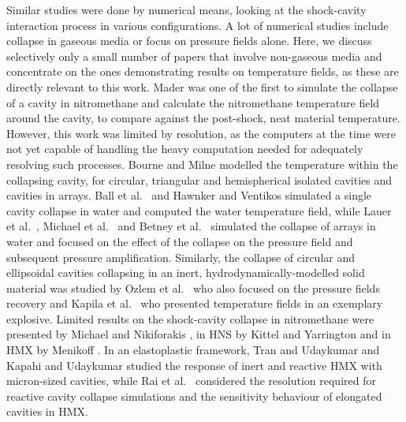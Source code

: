 \documentclass[3p,times,twocolumn]{elsarticle}
\begin{document}
Similar studies were done by numerical means, looking at the shock-cavity interaction process in various configurations. A lot of numerical studies include collapse in gaseous media or focus on pressure fields alone. Here, we discuss selectively only a small number of papers that involve non-gaseous media and concentrate on the ones demonstrating results on temperature fields, as these are directly relevant to this work. Mader \cite{mader1979numerical} was one of the first to simulate the collapse of a cavity in nitromethane and calculate the nitromethane temperature field around the cavity, to compare against the post-shock, neat material temperature. However, this work was limited by resolution, as the computers at the time were not yet capable of handling the heavy computation needed for adequately resolving such processes. Bourne and Milne \cite{bourne2002cavity,bourne2003temperature} modelled the temperature within the collapsing cavity, for circular, triangular and hemispherical isolated cavities and cavities in arrays. 
Ball et al.\ \cite{ball2000shock} and Hawnker and Ventikos \cite{hawker2012interaction} simulated a single cavity collapse in water and computed the water temperature field, while Lauer et al.\ \cite{lauer2012numerical}, Michael et al.\ \cite{michael2010numerical} and Betney et al.\ \cite{betney2015computational}  simulated the collapse of arrays in water and focused on the effect of the collapse on the pressure field and subsequent pressure amplification. 
Similarly, the collapse of circular and ellipsoidal cavities collapsing in an inert, hydrodynamically-modelled solid material was studied by Ozlem et al.\ \cite{ozlem2012numerical} who also focused on the pressure fields recovery and Kapila et al.\ \cite{kapila2015numerical} who presented temperature fields in an exemplary explosive. Limited results on the shock-cavity collapse in nitromethane were presented by Michael and Nikiforakis \cite{michael2015DetSymp}, in HNS by  Kittel and Yarrington \cite{kittell2016physically} and in HMX by Menikoff \cite{menikoff2004pore}. In an elastoplastic framework, Tran and Udaykumar \cite{tran2006simulation,tran2006simulation2} and Kapahi and Udaykumar \cite{kapahi2013dynamics} studied the response of inert and reactive HMX with micron-sized cavities, while Rai et al.\ \cite{rai2017high,rai2017collapse} considered the resolution required for reactive cavity collapse simulations and the sensitivity behaviour of elongated cavities in HMX.
\end{document}
